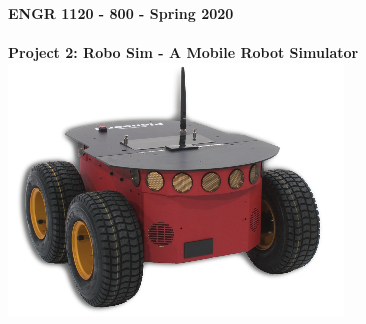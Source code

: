 \documentclass[11pt]{article}
\newcommand{\secNum}{1120 - 800}
\newcommand{\assnType}{Project}
\newcommand{\assnTitle}{Robo Sim - A Mobile Robot Simulator}
\newcommand{\assnNum}{2}
\newcommand{\currTerm}{Spring 2020}
\begin{document}
	\textbf{\LARGE ENGR \hspace{2mm}\secNum \hspace{1mm} - \hspace{1mm} \currTerm} \\\\
	\textbf{\LARGE \assnType \hspace{1mm}  \assnNum : \assnTitle}\\

         \includegraphics[scale=0.5]{hw2_fig1.png}
\end{document}

